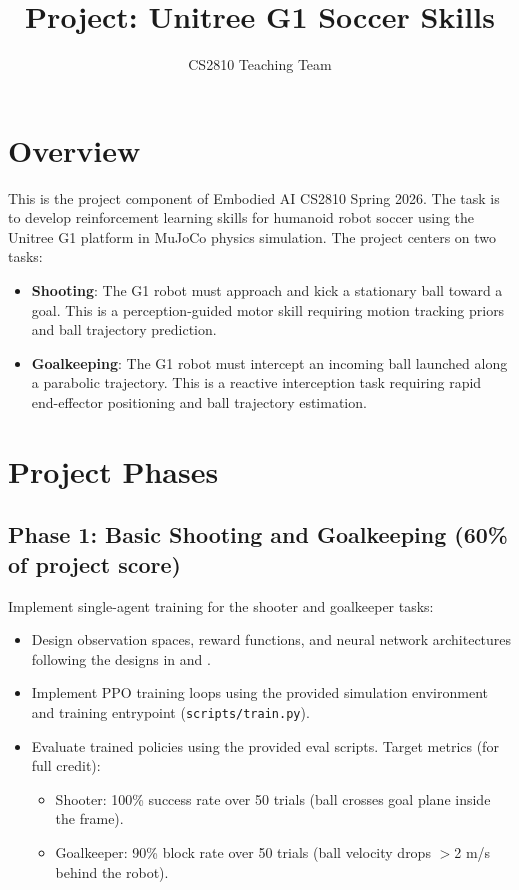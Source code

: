 \documentclass{article}
\title{Project: Unitree G1 Soccer Skills}
\author{CS2810 Teaching Team}
\begin{document}
\maketitle

\section{Overview}

This is the project component of Embodied AI CS2810 Spring 2026. The task is to develop reinforcement learning skills for humanoid robot soccer using the Unitree G1 platform in MuJoCo physics simulation. The project centers on two tasks:

\begin{itemize}
  \item \textbf{Shooting}: The G1 robot must approach and kick a stationary ball toward a goal. This is a perception-guided motor skill requiring motion tracking priors and ball trajectory prediction.
  \item \textbf{Goalkeeping}: The G1 robot must intercept an incoming ball launched along a parabolic trajectory. This is a reactive interception task requiring rapid end-effector positioning and ball trajectory estimation.
\end{itemize}

\section{Project Phases}

\subsection{Phase 1: Basic Shooting and Goalkeeping (60\% of project score)}

Implement single-agent training for the shooter and goalkeeper tasks:

\begin{itemize}
  \item Design observation spaces, reward functions, and neural network architectures following the designs in \cite{kong2026learningsoccerskillshumanoid} and \cite{ren2025humanoidgoalkeeper}.
  \item Implement PPO training loops using the provided simulation environment and training entrypoint (\texttt{scripts/train.py}).
  \item Evaluate trained policies using the provided eval scripts. Target metrics (for full credit):
    \begin{itemize}
      \item Shooter: 100\% success rate over 50 trials (ball crosses goal plane inside the frame).
      \item Goalkeeper: 90\% block rate over 50 trials (ball velocity drops $>$2 m/s behind the robot).
    \end{itemize}
\end{itemize}
\end{document}
